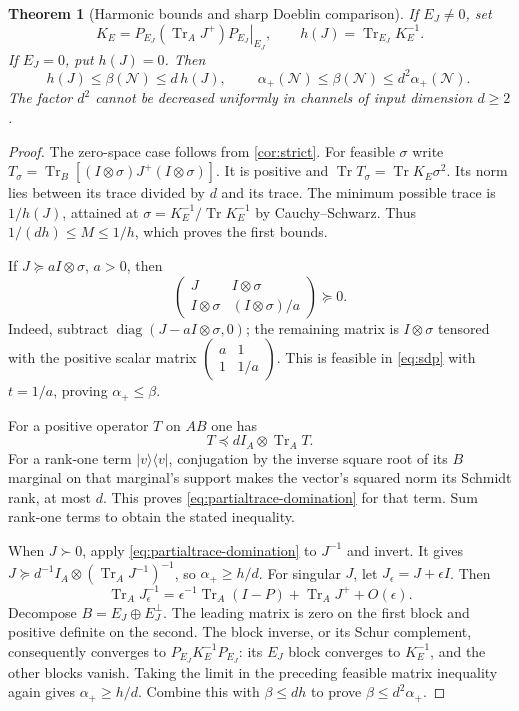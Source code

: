 \documentclass[11pt]{article}
\numberwithin{equation}{section}
\newtheorem{theorem}{Theorem}[section]
\theoremstyle{definition}
\theoremstyle{remark}
\DeclareMathOperator{\Tr}{Tr}
\DeclareMathOperator{\diag}{diag}
\newcommand{\N}{\mathcal N}
\newcommand{\ket}[1]{\lvert #1\rangle}
\newcommand{\bra}[1]{\langle #1\rvert}
\begin{document}
\begin{theorem}[Harmonic bounds and sharp Doeblin comparison]
\label{thm:doeblin-comparison}
If $E_J\ne0$, set
\[
 K_E=\left.P_{E_J}(\Tr_AJ^+)P_{E_J}\right|_{E_J},
 \qquad h(J)=\Tr_{E_J}K_E^{-1}.
\]
If $E_J=0$, put $h(J)=0$. Then
\begin{equation}
 h(J)\leq\beta(\N)\leq d\,h(J),\qquad
 \boxed{\ \alpha_+(\N)\leq\beta(\N)\leq d^2\alpha_+(\N).\ }
 \label{eq:doeblin-comparison}
\end{equation}
The factor $d^2$ cannot be decreased uniformly in channels of input
dimension $d\geq2$.
\end{theorem}
\begin{proof}
The zero-space case follows from \cref{cor:strict}.
For feasible $\sigma$ write
$T_\sigma=\Tr_B[(I\otimes\sigma)J^+(I\otimes\sigma)]$.
It is positive and
$\Tr T_\sigma=\Tr K_E\sigma^2$.
Its norm lies between its trace divided by $d$ and its trace.
The minimum possible trace is $1/h(J)$, attained at
$\sigma=K_E^{-1}/\Tr K_E^{-1}$ by Cauchy--Schwarz.
Thus $1/(dh)\leq M\leq1/h$, which proves the first bounds.

If $J\succeq aI\otimes\sigma$, $a>0$, then
\[
 \begin{pmatrix}J&I\otimes\sigma\\
 I\otimes\sigma&(I\otimes\sigma)/a\end{pmatrix}\succeq0.
\]
Indeed, subtract $\diag(J-aI\otimes\sigma,0)$; the remaining matrix
is $I\otimes\sigma$ tensored with the positive scalar matrix
$\left(\begin{smallmatrix}a&1\\1&1/a\end{smallmatrix}\right)$.
This is feasible in \eqref{eq:sdp} with $t=1/a$, proving
$\alpha_+\leq\beta$.

For a positive operator $T$ on $AB$ one has
\begin{equation}
 T\preceq dI_A\otimes\Tr_AT.
 \label{eq:partialtrace-domination}
\end{equation}
For a rank-one term $\ket v\bra v$, conjugation by the inverse square
root of its $B$ marginal on that marginal's support makes the vector's
squared norm its Schmidt rank, at most $d$. This proves
\eqref{eq:partialtrace-domination} for that term. Sum rank-one terms
to obtain the stated inequality.

When $J\succ0$, apply \eqref{eq:partialtrace-domination} to $J^{-1}$
and invert. It gives
$J\succeq d^{-1}I_A\otimes(\Tr_AJ^{-1})^{-1}$, so
$\alpha_+\geq h/d$. For singular $J$, let
$J_\epsilon=J+\epsilon I$. Then
\[
 \Tr_AJ_\epsilon^{-1}
 =\epsilon^{-1}\Tr_A(I-P)+\Tr_AJ^++O(\epsilon).
\]
Decompose $B=E_J\oplus E_J^\perp$. The leading matrix is zero on the
first block and positive definite on the second. The block inverse,
or its Schur complement, consequently converges to
$P_{E_J}K_E^{-1}P_{E_J}$: its $E_J$ block converges to $K_E^{-1}$,
and the other blocks vanish. Taking the limit in the preceding feasible
matrix inequality again gives $\alpha_+\geq h/d$.
Combine this with $\beta\leq dh$ to prove
$\beta\leq d^2\alpha_+$.


\end{proof}
\end{document}
